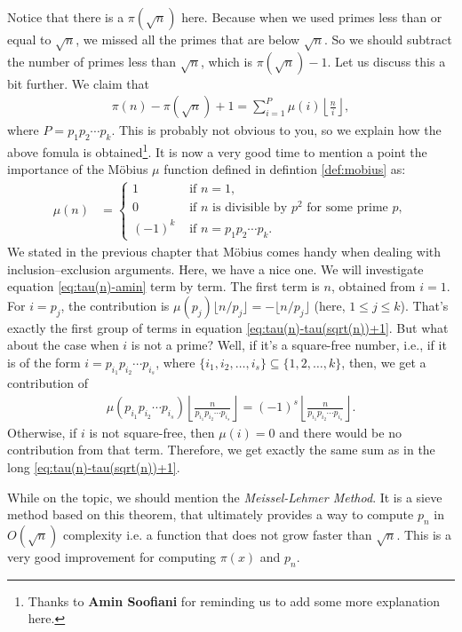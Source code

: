 \documentclass{subfiles}
\begin{document}
	Notice that there is a $\pi(\sqrt{n})$ here. Because when we used primes less than or equal to $\sqrt{n}$, we missed all the primes that are below $\sqrt{n}$. So we should subtract the number of primes less than $\sqrt{n}$, which is $\pi(\sqrt{n})-1$. Let us discuss this a bit further. We claim that
	\begin{align}
		\pi(n) -\pi(\sqrt{n})+1 = \sum_{i=1}^{P}\mu(i)\left\lfloor\frac{n}{i}\right\rfloor, \label{eq:tau(n)-amin}
	\end{align}
	where $P=p_1p_2\cdots p_k$. This is probably not obvious to you, so we explain how the above fomula is obtained\footnote{Thanks to \textbf{Amin Soofiani} for reminding us to add some more explanation here.}. It is now a very good time to mention a point the importance of the M\" obius $\mu$ function defined in defintion \eqref{def:mobius} as:
	\begin{align*}
		\mu(n) & =
		\begin{cases}
			1&\mbox{ if }n=1,\\
			0&\mbox{ if }n
			\mbox{ is divisible by }p^2
			\mbox{ for some prime }p,\\
			(-1)^k&\mbox{ if }n=p_1p_2\cdots p_k.
		\end{cases}
	\end{align*}
	We stated in the previous chapter that M\" obius comes handy when dealing with inclusion--exclusion arguments. Here, we have a nice one. We will investigate equation \eqref{eq:tau(n)-amin} term by term. The first term is $n$, obtained from $i=1$. For $i=p_j$, the contribution is $\mu(p_j)\lfloor n/p_j \rfloor=-\lfloor n/p_j \rfloor$ (here, $1 \leq j \leq k$). That's exactly the first group of terms in equation \eqref{eq:tau(n)-tau(sqrt(n))+1}. But what about the case when $i$ is not a prime? Well, if it's a square-free number, i.e., if it is of the form $i=p_{i_1}p_{i_2}\cdots p_{i_s}$, where $\{i_1, i_2, \ldots, i_s\} \subseteq \{1,2,\ldots,k\}$, then, we get a contribution of
	\begin{align*}
		\mu(p_{i_1}p_{i_2}\cdots p_{i_s}) \left\lfloor\frac{n}{p_{i_1}p_{i_2}\cdots p_{i_s}}\right\rfloor = (-1)^s\left\lfloor\frac{n}{p_{i_1}p_{i_2}\cdots p_{i_s}}\right\rfloor.
	\end{align*}
	Otherwise, if $i$ is not square-free, then $\mu(i)=0$ and there would be no contribution from that term. Therefore, we get exactly the same sum as in the long \eqref{eq:tau(n)-tau(sqrt(n))+1}.



	While on the topic, we should mention the \textit{Meissel-Lehmer Method}. It is a sieve method based on this theorem, that ultimately provides a way to compute $p_n$ in $O(\sqrt{n})$ complexity i.e. a function that does not grow faster than $\sqrt{n}$. This is a very good improvement for computing $\pi(x)$ and $p_n$.
\end{document}
